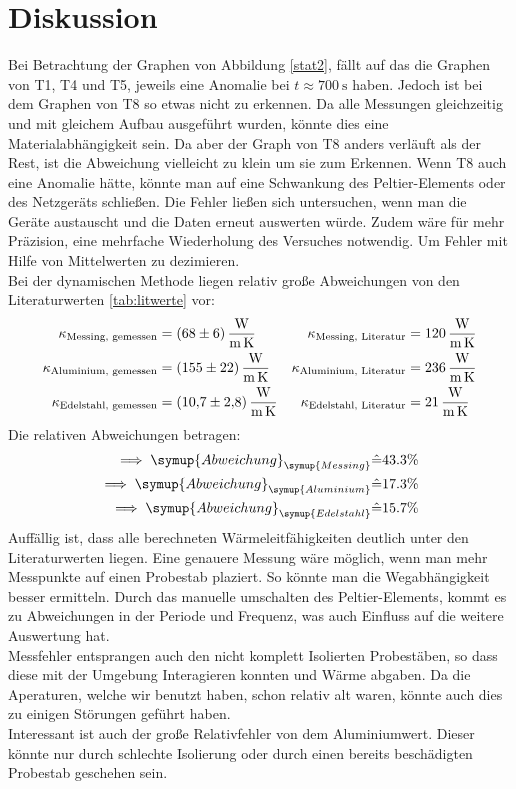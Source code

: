 \section{Diskussion}
\label{sec:Diskussion}
Bei Betrachtung der Graphen von Abbildung \ref{stat2}, fällt auf das die Graphen von T1, T4 und T5, jeweils eine Anomalie bei $t \approx \SI{700}{\second}$ haben.
Jedoch ist bei dem Graphen von T8 so etwas nicht zu erkennen. Da alle Messungen gleichzeitig und mit gleichem Aufbau ausgeführt wurden, 
könnte dies eine Materialabhängigkeit sein. Da aber der Graph von T8 anders verläuft als der Rest, ist die Abweichung vielleicht zu klein um sie zum Erkennen.
Wenn T8 auch eine Anomalie hätte, könnte man auf eine Schwankung des Peltier-Elements oder des Netzgeräts schließen.
Die Fehler ließen sich untersuchen, wenn man die Geräte austauscht und die Daten erneut auswerten würde. 
Zudem wäre für mehr Präzision, eine mehrfache Wiederholung des Versuches notwendig. Um Fehler mit Hilfe von Mittelwerten zu dezimieren.
\\
Bei der dynamischen Methode liegen relativ große Abweichungen von den Literaturwerten \ref{tab:litwerte} vor:
\begin{align*}
    \kappa_\text{Messing, gemessen} &= \SI{68 \pm 6}{\watt\per\metre\per\kelvin} & \kappa_\text{Messing, Literatur} &= \SI{120}{\watt\per\metre\per\kelvin}\\
    \kappa_\text{Aluminium, gemessen} &= \SI{155 \pm 22}{\watt\per\metre\per\kelvin} & \kappa_\text{Aluminium, Literatur} &= \SI{236}{\watt\per\metre\per\kelvin}\\
    \kappa_\text{Edelstahl, gemessen} &= \SI{10.7 \pm 2.8}{\watt\per\metre\per\kelvin} & \kappa_\text{Edelstahl, Literatur} &= \SI{21}{\watt\per\metre\per\kelvin}
\end{align*}
Die relativen Abweichungen betragen:
\begin{align*}
    \implies \symup{Abweichung}_{\symup{Messing}} &\hat{=} 43.3 \%\\
    \implies \symup{Abweichung}_{\symup{Aluminium}} &\hat{=} 17.3\%\\
    \implies \symup{Abweichung}_{\symup{Edelstahl}} &\hat{=} 15.7 \%
\end{align*}
Auffällig ist, dass alle berechneten Wärmeleitfähigkeiten deutlich unter den Literaturwerten liegen.
Eine genauere Messung wäre möglich, wenn man mehr Messpunkte auf einen Probestab plaziert. So könnte man die Wegabhängigkeit besser ermitteln.
Durch das manuelle umschalten des Peltier-Elements, kommt es zu Abweichungen in der Periode und Frequenz, was auch Einfluss auf die weitere Auswertung hat.
\\
Messfehler entsprangen auch den nicht komplett Isolierten Probestäben, so dass diese mit der Umgebung Interagieren konnten und Wärme abgaben.
Da die Aperaturen, welche wir benutzt haben, schon relativ alt waren, könnte auch dies zu einigen Störungen geführt haben.
\\
Interessant ist auch der große Relativfehler von dem Aluminiumwert. Dieser könnte nur durch schlechte Isolierung oder durch einen bereits beschädigten Probestab geschehen sein.



